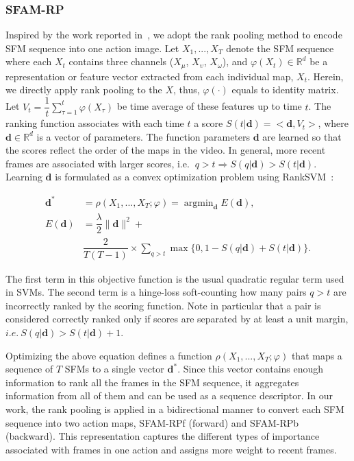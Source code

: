 \documentclass[10pt,twocolumn,letterpaper]{article}
\begin{document}
\subsubsection{SFAM-RP}
Inspired by the work reported in~\cite{bilen2016dynamic}, we adopt the rank 
pooling method to encode SFM sequence into one action image. Let 
$X_{1},...,X_{T}$ denote the SFM sequence where each $X_{t}$ contains three 
channels ($X_{\mu}$, $X_{\upsilon}$, $X_{\omega}$), and $\varphi(X_{t}) \in 
\mathbb{R}^{d}$ be a representation or feature vector extracted from each 
individual map, $X_{t}$. Herein, we directly apply rank pooling to the $X$, 
thus, $\varphi(\cdot)$ equals to identity matrix.  Let $V_{t} = 
\dfrac{1}{t}\sum_{\tau=1}^{t}\varphi(X_{\tau})$ be time average of these 
features up to time $t$. The ranking function associates with each time $t$ a 
score $S(t|\textbf{d}) = <\textbf{d}, V_{t}>$, where $\textbf{d} \in 
\mathbb{R}^{d}$ is a vector of parameters. The function parameters $\textbf{d}$ 
are learned so that the scores reflect the order of the maps in the video. In 
general, more recent frames are associated with larger scores, i.e. $~q > t 
\Rightarrow S(q|\textbf{d}) > S(t|\textbf{d})$. Learning $\textbf{d}$ is 
formulated as a convex optimization problem using 
RankSVM~\cite{smola2004tutorial}:

\begin{equation}
\begin{aligned}
\textbf{d}^{*} &=\rho(X_{1},...,X_{T};\varphi) = \mathop{\arg\min}_{\textbf{d}} E(\textbf{d}),\\
  E(\textbf{d}) &= \dfrac{\lambda}{2}\parallel \textbf{d} \parallel^{2} +\\
  & \dfrac{2}{T(T-1)}\times\sum\limits_{q>t}\max\{{0,1-S(q|\textbf{d}) + S(t|\textbf{d})}\}.
\end{aligned}
\end{equation}

The first term in this objective function is the usual quadratic regular term 
used in SVMs. 
The second term is a hinge-loss soft-counting how many pairs $q > t$ are 
incorrectly ranked by the scoring function. Note in particular that a pair is 
considered correctly ranked only if scores are separated by at least a unit 
margin, $i.e.~ S(q|\textbf{d}) > S(t|\textbf{d}) + 1$. 

Optimizing the above equation defines a function $\rho(X_{1},...,X_{T};\varphi)$ 
that maps a sequence of $T$ SFMs to a single vector $\textbf{d}^{*}$. Since 
this vector contains enough information to rank all the frames in the SFM 
sequence, it aggregates information from all of them and can be used as a 
sequence descriptor.  In our work, the rank pooling is applied in a bidirectional 
manner to convert each SFM sequence into two action maps, SFAM-RPf (forward) 
and SFAM-RPb (backward). This representation captures the different 
types of importance associated with frames in one action and assigns more 
weight to recent frames. 
\end{document}
